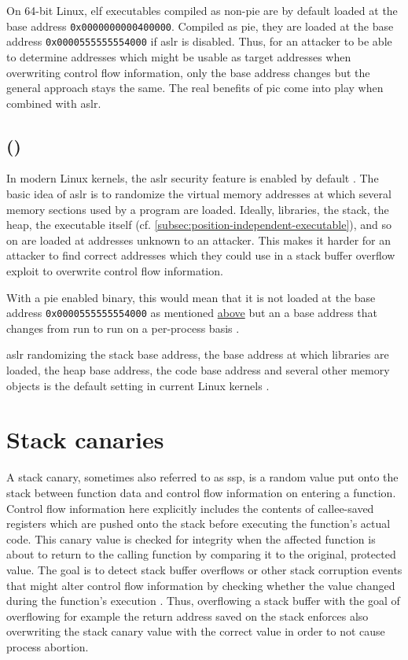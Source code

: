 On 64-bit Linux, \gls{elf} executables compiled as non-\acrshort{pie} are by default loaded at the base address \texttt{0x0000000000400000}.
Compiled as \gls{pie}, they are loaded at the base address \texttt{0x0000555555554000} if \gls{aslr} is disabled.
Thus, for an attacker to be able to determine addresses which might be usable as target addresses when overwriting control flow information, only the base address changes but the general approach stays the same.
The real benefits of \gls{pic} come into play when combined with \gls{aslr}.

\subsection{ ()}
\label{subsec:address-space-layout-randomization}

In modern Linux kernels, the \gls{aslr} security feature is enabled by default \cite{Boelen2018}.
The basic idea of \gls{aslr} is to randomize the virtual memory addresses at which several memory sections used by a program are loaded.
Ideally, libraries, the stack, the heap, the executable itself (cf. \cref{subsec:position-independent-executable}), and so on are loaded at addresses unknown to an attacker.
This makes it harder for an attacker to find correct addresses which they could use in a stack buffer overflow exploit to overwrite control flow information.

With a \gls{pie} enabled binary, this would mean that it is not loaded at the base address \texttt{0x0000555555554000} as mentioned \hyperref[subsec:position-independent-executable]{above} but an a base address that changes from run to run on a per-process basis \cite{MarcoGisbert2014}.

\gls{aslr} randomizing the stack base address, the base address at which libraries are loaded, the heap base address, the code base address and several other memory objects is the default setting in current Linux kernels \cites{Boelen2018,Kernel2020a}[14]{OracleCorporation2020}.

\section{Stack canaries}
\label{sec:stack-canaries}

A stack canary, sometimes also referred to as \gls{ssp}, is a random value put onto the stack between function data and control flow information on entering a function.
Control flow information here explicitly includes the contents of callee-saved registers which are pushed onto the stack before executing the function's actual code.
This canary value is checked for integrity when the affected function is about to return to the calling function by comparing it to the original, protected value.
The goal is to detect stack buffer overflows or other stack corruption events that might alter control flow information by checking whether the value changed during the function's execution \cites[2]{Bierbaumer2018}{FSF2019}.
Thus, overflowing a stack buffer with the goal of overflowing for example the return address saved on the stack enforces also overwriting the stack canary value with the correct value in order to not cause process abortion.

